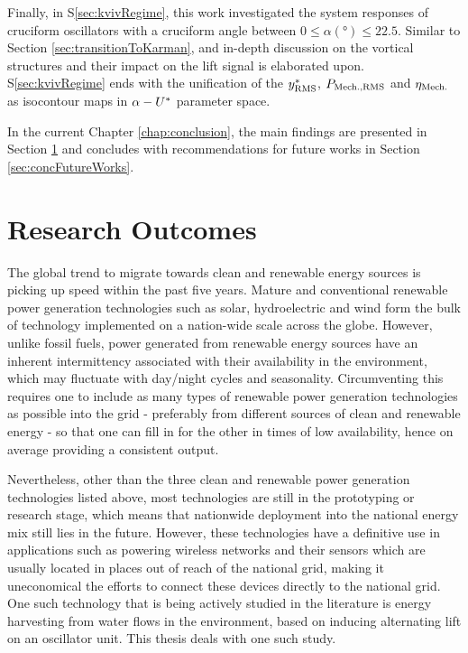 \documentclass[oneside]{utmthesis}
\begin{document}
Finally, in S\ref{sec:kvivRegime}, this work investigated the system responses of cruciform oscillators with a cruciform angle between $0 \leq \alpha (\si{\degree}) \leq 22.5$. Similar to Section \ref{sec:transitionToKarman}, and in-depth discussion on the vortical structures and their impact on the lift signal is elaborated upon. S\ref{sec:kvivRegime} ends with the unification of the $y^{*}_{\text{RMS}}$, $P_{\text{Mech.,RMS}}$ and $\eta_{\text{Mech.}}$ as isocontour maps in $\alpha - U^{*}$ parameter space.

In the current Chapter \ref{chap:conclusion}, the main findings are presented in Section \ref{sec:concResearchOutcome} and concludes with recommendations for future works in Section \ref{sec:concFutureWorks}.

\section{Research Outcomes} \label{sec:concResearchOutcome}
The global trend to migrate towards clean and renewable energy sources is picking up speed within the past five years. Mature and conventional renewable power generation technologies such as solar, hydroelectric and wind form the bulk of technology implemented on a nation-wide scale across the globe. However, unlike fossil fuels, power generated from renewable energy sources have an inherent intermittency associated with their availability in the environment, which may fluctuate with day/night cycles and seasonality. Circumventing this requires one to include as many types of renewable power generation technologies as possible into the grid - preferably from different sources of clean and renewable energy - so that one can fill in for the other in times of low availability, hence on average providing a consistent output.

Nevertheless, other than the three clean and renewable power generation technologies listed above, most technologies are still in the prototyping or research stage, which means that nationwide deployment into the national energy mix still lies in the future. However, these technologies have a definitive use in applications such as powering wireless networks and their sensors which are usually located in places out of reach of the national grid, making it uneconomical the efforts to connect these devices directly to the national grid. One such technology that is being actively studied in the literature is energy harvesting from water flows in the environment, based on inducing alternating lift on an oscillator unit. This thesis deals with one such study.
\end{document}
